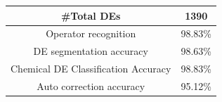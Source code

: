 \documentclass[conference]{IEEEtran}
\begin{document}


\begin{table}
\begin{center}
 \begin{tabular}{| c | c |}
 \hline
 \#Total DEs & 1390\\
 \hline
Operator recognition & 98.83\% \\
\hline
 DE segmentation accuracy & 98.63\% \\
 \hline
Chemical DE Classification Accuracy & 98.83\%\\
\hline 
Auto correction accuracy & 95.12\% \\
\hline

 \end{tabular}
 \end{center}
 \label{table:result}
 \end{table}

\end{document}
